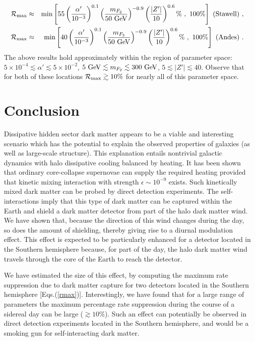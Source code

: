 \documentclass[12pt]{article}
\begin{document}
%
\begin{eqnarray}
{\cal R} _{\max} & \approx & \min \left [ 55\left ( \frac{\alpha '}{10 ^{-3}} \right ) ^{0.1}\left ( \frac{m _{F_2}}{50 \ \rm GeV} \right ) ^{-0.9}\left ( \frac{|Z'|}{10} \right ) ^{0.6} \% \ , \ 100 \% \right ] \ ({\rm Stawell})  \ , \nonumber \\
{\cal R} _{\max} & \approx & \min \left [ 40\left ( \frac{\alpha '}{10 ^{-3}} \right ) ^{0.1}\left ( \frac{m _{F_2}}{50 \ \rm GeV} \right ) ^{-0.9}\left ( \frac{|Z'|}{10} \right ) ^{0.6} \% \ , \ 100 \% \right ] \ ({\rm Andes}) \ .
\label{rmax}
\end{eqnarray}
%
The above results hold approximately within the region of parameter space: $5 \times 10 ^{-4} \lesssim \alpha ' \lesssim 5 \times 10 ^{-2}$, $5 \ {\rm GeV} \lesssim m _{F_2} \lesssim 300 \ {\rm GeV}$, $5 \lesssim |Z'| \lesssim 40$. Observe that for both of these locations ${\cal R} _{\max} \gtrsim 10\%$ for nearly all of this parameter space.


\section{Conclusion}

Dissipative hidden sector dark matter appears to be a viable and interesting scenario which has the potential to explain the observed properties of galaxies (as well as large-scale structure). This explanation entails nontrivial galactic dynamics with halo dissipative cooling balanced by heating. It has been shown that ordinary core-collapse supernovae can supply the required heating provided that kinetic mixing interaction with strength $\epsilon \sim 10 ^{-9}$ exists. Such kinetically mixed dark matter can be probed by direct detection experiments. The self-interactions imply that this type of dark matter can be captured within the Earth and shield a dark matter detector from part of the halo dark matter wind. We have shown that, because the direction of this wind changes during the day, so does the amount of shielding, thereby giving rise to a diurnal modulation effect. This effect is expected to be particularly enhanced for a detector located in the Southern hemisphere because, for part of the day, the halo dark matter wind travels through the core of the Earth to reach the detector.

We have estimated the size of this effect, by computing the maximum rate suppression due to dark matter capture for two detectors located in the Southern hemisphere [Eqs.(\ref{rmax})]. Interestingly, we have found that for a large range of parameters the maximum percentage rate suppression during the course of a sidereal day can be large ($\gtrsim 10\%$). Such an effect can potentially be observed in direct detection experiments located in the Southern hemisphere, and would be a smoking gun for self-interacting dark matter.
\end{document}

